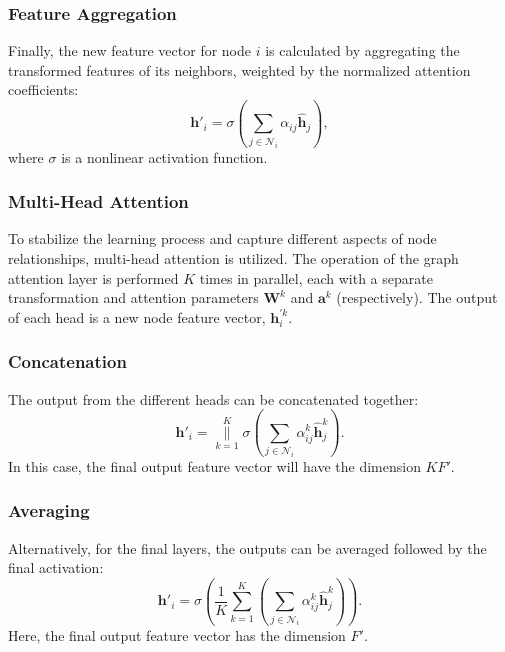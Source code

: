 \documentclass[11pt]{article}
\begin{document}
	\subsubsection{Feature Aggregation}
	Finally, the new feature vector for node $i$ is calculated by aggregating the transformed features of its neighbors, weighted by the normalized attention coefficients:
	\begin{equation}
		\mathbf{h}'_i = \sigma \left( \sum_{j \in \mathcal{N}_i} \alpha_{ij} \hat{\mathbf{h}}_j \right),
	\end{equation}
	where $\sigma$ is a nonlinear activation function.
	
	\subsubsection{Multi-Head Attention}
	To stabilize the learning process and capture different aspects of node relationships, multi-head attention is utilized.  The operation of the graph attention layer is performed $K$ times in parallel, each with a separate transformation and attention parameters $\mathbf{W}^k$ and $\mathbf{a}^k$ (respectively). The output of each head is a new node feature vector, $\mathbf{h}_i^{'k}$.
	
	\subsubsection{Concatenation}
	The output from the different heads can be concatenated together:
	\begin{equation}
		\mathbf{h}'_i = \underset{k=1}{\overset{K}{\parallel}} \sigma \left( \sum_{j \in \mathcal{N}_i} \alpha_{ij}^k \mathbf{\hat{h}}_j^k \right).
	\end{equation}
	In this case, the final output feature vector will have the dimension $KF'$.
	
	\subsubsection{Averaging}
	Alternatively, for the final layers, the outputs can be averaged followed by the final activation:
	\begin{equation}
		\mathbf{h}'_i = \sigma\left(\frac{1}{K} \sum_{k=1}^K \left( \sum_{j \in \mathcal{N}_i} \alpha_{ij}^k \mathbf{\hat{h}}_j^k \right) \right).
	\end{equation}
	Here, the final output feature vector has the dimension $F'$.
\end{document}
